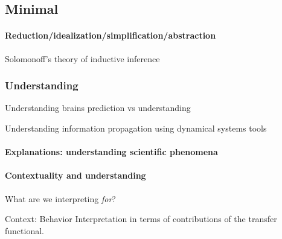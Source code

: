 \documentclass{article}
\theoremstyle{definition} \newtheorem{definition}{Definition}  \newtheorem{example}{Example}
\theoremstyle{remark} \newtheorem{remark}{Remark}
\newcounter{ct}
\begin{document}
\subsection{Minimal}
\citep{beer1996toward}
\citep{lafferriere2000minimal}
\citep{chirimuuta2014minimal}
\citep{batterman2014minimal}
\citep{brancazio2023minimal}

\citep{Jordan2019a}

\paragraph{Reduction/idealization/simplification/abstraction}
\citep{marr1976computation, marr2010vision}

\citep{chirimuuta2018mmm} %

\citep{potochnik2021levels,
potochnik2020idealization,
potochnik2017idealization}

\citep{stinson2020idealized}
\citep{chirimuuta2024brain} 

Solomonoff's theory of inductive inference


\subsubsection{Understanding}
\citep{deregt2017understanding}
\citep{potochnik2017idealization}
\citep{guest2023logical}

Understanding brains \citep{marder2015understanding} \citep{lindsay2023testing} \citep{barman2024towards} \citep{dowling2018understanding}
prediction vs understanding \citep{chirimuuta2021prediction}

Understanding information propagation using dynamical systems tools \citep{vogt2022lyapunov}

\paragraph{Explanations: understanding scientific phenomena}
\citep{parascandolo2021learning}

\paragraph{Contextuality and understanding}
What are we interpreting \emph{for}?

Context: Behavior %
Interpretation in terms of contributions of the transfer functional.


\end{document}

